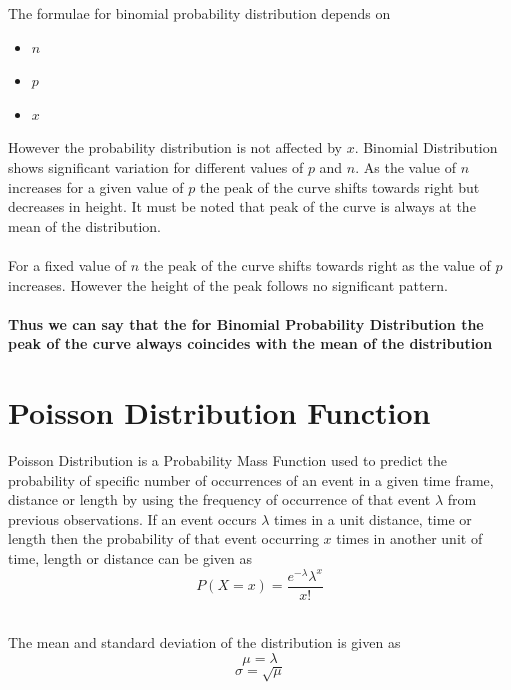 \documentclass[twoside,12pt]{report}  %
\begin{document}
\noindent
The formulae for binomial probability distribution depends on
\begin{itemize}
	\item $n$
	\item $p$
	\item $x$
\end{itemize}
\noindent
However the probability distribution is not affected by $x$. Binomial Distribution shows significant variation for different values of $p$ and $n$. As the value of $n$ increases for a given value of $p$ the peak of the curve shifts towards right but decreases in height. It must be noted that peak of the curve is always at the mean of the distribution.
\\
\\
For a fixed value of $n$ the peak of the curve shifts towards right as the value of $p$ increases. However the height of the peak follows no significant pattern.
\\
\\
\textbf{Thus we can say that the for Binomial Probability Distribution the peak of the curve always coincides with the mean of the distribution}  


\section{Poisson Distribution Function}

\begin{tcolorbox}[colback=red!5!white, colframe=red!75!black, title = \textbf{Poisson Distribution Function}]
	Poisson Distribution is a Probability Mass Function used to predict the probability of specific number of occurrences of an event in a given time frame, distance or length by using the frequency of occurrence of that event $\lambda$ from previous observations. If an event occurs $\lambda$ times in a unit distance, time or length then the probability of that event occurring $x$ times in another unit of time, length or distance can be given as
	$$ \boxed{P(X=x) = \frac{e^{-\lambda} \lambda^{x}}{x!}} $$

\end{tcolorbox}
\noindent
\\
The mean and standard deviation of the distribution is given as
$$ \boxed{\mu = \lambda} $$
$$ \boxed{\sigma = \sqrt{\mu}} $$
\end{document}
